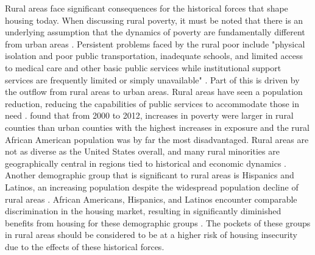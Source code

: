  

Rural areas face significant consequences for the historical forces that shape housing today. When discussing rural poverty, it must be noted that there is an underlying assumption that the dynamics of poverty are fundamentally different from urban areas \citep{thiede_spatial_2018}. Persistent problems faced by the rural poor include "physical isolation and poor public transportation, inadequate schools, and limited access to medical care and other basic public services while institutional support services are frequently limited or simply unavailable" \citep[333]{lichter_changing_2007}. Part of this is driven by the outflow from rural areas to urban areas. Rural areas have seen a population reduction, reducing the capabilities of public services to accommodate those in need \citep{bjerke_mover_2019}. \citet{thiede_spatial_2018} found that from 2000 to 2012, increases in poverty were larger in rural counties than urban counties with the highest increases in exposure and the rural African American population was by far the most disadvantaged. Rural areas are not as diverse as the United States overall, and many rural minorities are geographically central in regions tied to historical and economic dynamics \citep{housing_assistance_council_race_2012}. Another demographic group that is significant to rural areas is Hispanics and Latinos, an increasing population despite the widespread population decline of rural areas \citep{lichter_demographic_2020}. African Americans, Hispanics, and Latinos encounter comparable discrimination in the housing market, resulting in significantly diminished benefits from housing for these demographic groups \citep{krivo_housing_2004}. The pockets of these groups in rural areas should be considered to be at a higher risk of housing insecurity due to the effects of these historical forces.  

 

